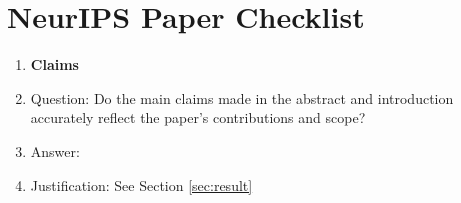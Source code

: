 \newpage
\section*{NeurIPS Paper Checklist}

\begin{enumerate}

\item {\bf Claims}
    \item[] Question: Do the main claims made in the abstract and introduction accurately reflect the paper's contributions and scope?
    \item[] Answer: \answerYes{} %
    \item[] Justification: See Section \ref{sec:result}


\end{enumerate}

